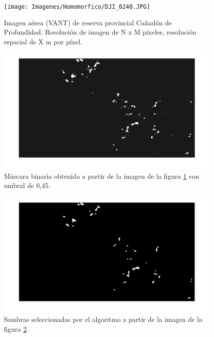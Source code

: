 \begin{figure}[h!]
    \texttt{[image: Imagenes/Homomorfico/DJI\_0240.JPG]}
     \hfill
     \caption{Imagen aérea (VANT) de reserva provincial Cañadón de Profundidad. Resolución de imagen de N x M píxeles, resolución espacial de X m por píxel.}
    \label{Cañadon_homo}
\end{figure}

\begin{figure}[h!]
    \includegraphics[width=\textwidth]{Imagenes/Homomorfico/DJI_240_bin.png}
     \hfill
     \caption{Máscara binaria obtenida a partir de la imagen de la figura \ref{Cañadon_homo} con umbral de 0,45.}
    \label{mascaraCañadon}
\end{figure}

\begin{figure}[h!]
    \includegraphics[width=\textwidth]{Imagenes/Homomorfico/DJI_240_sel.png}
     \hfill
     \caption{Sombras seleccionadas por el algoritmo a partir de la imagen de la figura \ref{mascaraCañadon}.}
    \label{seleccionadaDJI240}
\end{figure}

